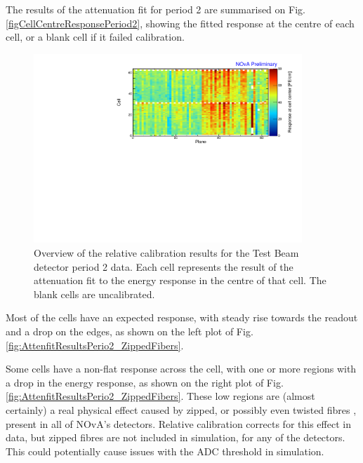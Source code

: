 The results of the attenuation fit for period 2 are summarised on Fig. \ref{figCellCentreResponsePeriod2}, showing the fitted response at the centre of each cell, or a blank cell if it failed calibration.

\begin{figure}[h]
\centering
\includegraphics[width=0.9\textwidth]{PlotsTBCalibTechnote/CellResponseAtCentre_period2_Limited_NOvAPlotStyle.pdf}
\caption{Overview of the relative calibration results for the Test Beam detector period 2 data. Each cell represents the result of the attenuation fit to the energy response in the centre of that cell. The blank cells are uncalibrated.}
\label{fig:CellCentreResponsePeriod2}
\end{figure}

Most of the cells have an expected response, with steady rise towards the readout and a drop on the edges, as shown on the left plot of Fig. \ref{fig:AttenfitResultsPerio2_ZippedFibers}.

Some cells have a non-flat response across the cell, with one or more regions with a drop in the energy response, as shown on the right plot of Fig. \ref{fig:AttenfitResultsPerio2_ZippedFibers}. These low regions are (almost certainly) a real physical effect caused by zipped, or possibly even twisted fibres \cite{NOVA-doc-43249}, present in all of NOvA's detectors. Relative calibration corrects for this effect in data, but zipped fibres are not included in simulation, for any of the detectors. This could potentially cause issues with the ADC threshold in simulation.

